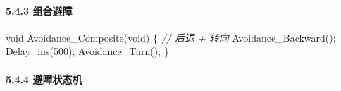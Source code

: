 \documentclass[
]{article}
\newenvironment{Shaded}{}{}
\newcommand{\CommentTok}[1]{\textcolor[rgb]{0.38,0.63,0.69}{\textit{#1}}}
\newcommand{\DataTypeTok}[1]{\textcolor[rgb]{0.56,0.13,0.00}{#1}}
\newcommand{\DecValTok}[1]{\textcolor[rgb]{0.25,0.63,0.44}{#1}}
\newcommand{\NormalTok}[1]{#1}
\begin{document}
\hypertarget{ux7ec4ux5408ux907fux969c}{%
\paragraph{5.4.3 组合避障}\label{ux7ec4ux5408ux907fux969c}}

\begin{Shaded}
\begin{Highlighting}[]
\DataTypeTok{void}\NormalTok{ Avoidance\_Composite(}\DataTypeTok{void}\NormalTok{)}
\NormalTok{\{}
    \CommentTok{// 后退 + 转向}
\NormalTok{    Avoidance\_Backward();}
\NormalTok{    Delay\_ms(}\DecValTok{500}\NormalTok{);}
\NormalTok{    Avoidance\_Turn();}
\NormalTok{\}}
\end{Highlighting}
\end{Shaded}

\hypertarget{ux907fux969cux72b6ux6001ux673a}{%
\paragraph{5.4.4 避障状态机}\label{ux907fux969cux72b6ux6001ux673a}}
\end{document}
